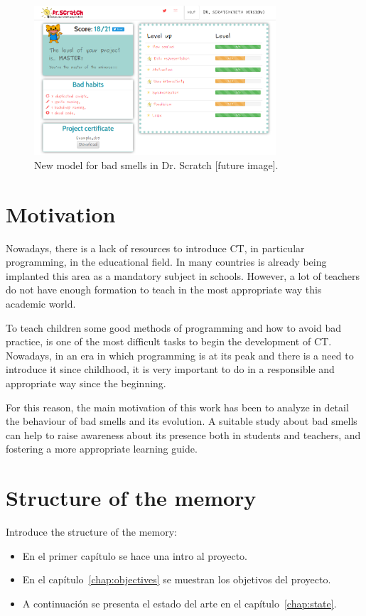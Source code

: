 \begin{figure}[h]
  \centering
  \includegraphics[width=9cm, keepaspectratio]{img/dashboards.png}
  \caption{New model for bad smells in Dr. Scratch [future image].}
  \label{fig:bad_smells}
\end{figure}



\section{Motivation}
\label{sec:motivation}

Nowadays, there is a lack of resources to introduce CT, in particular programming, in the educational field. In many countries is already being implanted this area as a mandatory subject in schools. However, a lot of teachers do not have enough formation to teach in the most appropriate way this academic world. 

To teach children some good methods of programming and how to avoid bad practice, is one of the most difficult tasks to begin the development of CT. Nowadays, in an era in which programming is at its peak and there is a need to introduce it since childhood, it is very important to do in a responsible and appropriate way since the beginning. 

For this reason, the main motivation of this work has been to analyze in detail the behaviour of bad smells and its evolution. A suitable study about bad smells can help to raise awareness about its presence both in students and teachers, and fostering a more appropriate learning guide.


\section{Structure of the memory}
\label{sec:structure}

Introduce the structure of the memory:

\begin{itemize}
  \item En el primer capítulo se hace una intro al proyecto.
  
  \item En el capítulo~\ref{chap:objectives} se muestran los objetivos del proyecto.
  
  \item A continuación se presenta el estado del arte en el capítulo~\ref{chap:state}.
  
\end{itemize}


